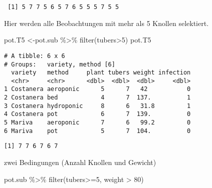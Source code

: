 \documentclass[
  letterpaper,
  DIV=11,
  numbers=noendperiod]{scrartcl}
\newenvironment{Shaded}{\begin{snugshade}}{\end{snugshade}}
\newcommand{\DecValTok}[1]{\textcolor[rgb]{0.68,0.00,0.00}{#1}}
\newcommand{\FunctionTok}[1]{\textcolor[rgb]{0.28,0.35,0.67}{#1}}
\newcommand{\NormalTok}[1]{\textcolor[rgb]{0.00,0.23,0.31}{#1}}
\newcommand{\OtherTok}[1]{\textcolor[rgb]{0.00,0.23,0.31}{#1}}
\newcommand{\SpecialCharTok}[1]{\textcolor[rgb]{0.37,0.37,0.37}{#1}}
\begin{document}
\begin{Shaded}
\end{Shaded}

\begin{verbatim}
 [1] 5 7 7 5 6 5 7 6 5 5 5 7 5 5
\end{verbatim}

Hier werden alle Beobachtungen mit mehr als 5 Knollen selektiert.

\begin{Shaded}
\begin{Highlighting}[]
\NormalTok{pot.T5 }\OtherTok{\textless{}{-}}\NormalTok{pot.sub }\SpecialCharTok{\%\textgreater{}\%} \FunctionTok{filter}\NormalTok{(tubers}\SpecialCharTok{\textgreater{}}\DecValTok{5}\NormalTok{)}
\NormalTok{pot.T5}
\end{Highlighting}
\end{Shaded}

\begin{verbatim}
# A tibble: 6 x 6
# Groups:   variety, method [6]
  variety   method     plant tubers weight infection
  <chr>     <chr>      <dbl>  <dbl>  <dbl>     <dbl>
1 Costanera aeroponic      5      7   42           0
2 Costanera bed            4      7  137.          1
3 Costanera hydroponic     8      6   31.8         1
4 Costanera pot            6      7  139.          0
5 Mariva    aeroponic      7      6   99.2         0
6 Mariva    pot            5      7  104.          0
\end{verbatim}

\begin{Shaded}
\end{Shaded}

\begin{verbatim}
[1] 7 7 6 7 6 7
\end{verbatim}

zwei Bedingungen (Anzahl Knollen und Gewicht)

\begin{Shaded}
\begin{Highlighting}[]
\NormalTok{pot.sub }\SpecialCharTok{\%\textgreater{}\%} \FunctionTok{filter}\NormalTok{(tubers}\SpecialCharTok{\textgreater{}=}\DecValTok{5}\NormalTok{, weight }\SpecialCharTok{\textgreater{}} \DecValTok{80}\NormalTok{)}
\end{Highlighting}
\end{Shaded}
\end{document}
